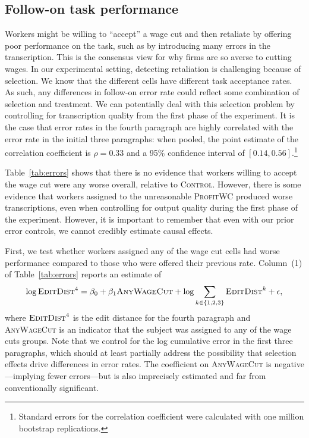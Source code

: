 \documentclass[11pt]{article}
\begin{document}
\subsection{Follow-on task performance}
Workers might be willing to ``accept'' a wage cut and then retaliate by offering poor performance on the task, such as by introducing many errors in the transcription.
This is the consensus view for why firms are so averse to cutting wages. 
In our experimental setting, detecting retaliation is challenging because of selection.
We know that the different cells have different task acceptance rates. 
As such, any differences in follow-on error rate could reflect some combination of selection and treatment.
We can potentially deal with this selection problem by controlling for transcription quality from the first phase of the experiment. 
It is the case that error rates in the fourth paragraph are highly correlated with the error rate in the initial three paragraphs: 
when pooled, the point estimate of the correlation coefficient is $\rho = 0.33$ and a 95\% confidence interval of $[0.14, 0.56]$.\footnote{
  Standard errors for the correlation coefficient were calculated with one million bootstrap replications.
}

Table~\ref{tab:errors} shows that there is no evidence that workers willing to accept the wage cut were any worse overall, relative to \textsc{Control}.
However, there is some evidence that workers assigned to the unreasonable \textsc{ProfitWC} produced worse transcriptions, even when controlling for output quality during the first phase of the experiment. 
However, it is important to remember that even with our prior error controls, we cannot credibly estimate causal effects.



First, we test whether workers assigned any of the wage cut cells had worse performance compared to those who were offered their previous rate.
Column~(1) of Table~\ref{tab:errors} reports an estimate of 
\begin{align}
  \log \textsc{EditDist}^4 = \beta_0 + \beta_1 \textsc{AnyWageCut} + \log \sum_{k \in \{1,2,3\}} \textsc{EditDist}^k + \epsilon,
\end{align}
where $\textsc{EditDist}^4$ is the edit distance for the fourth paragraph and \textsc{AnyWageCut} is an indicator that the subject was assigned to any of the wage cuts groups.
Note that we control for the log cumulative error in the first three paragraphs, which should at least partially address the possibility that selection effects drive differences in error rates.  
The coefficient on \textsc{AnyWageCut} is negative---implying fewer errors---but is also imprecisely estimated and far from conventionally significant.
\end{document}
